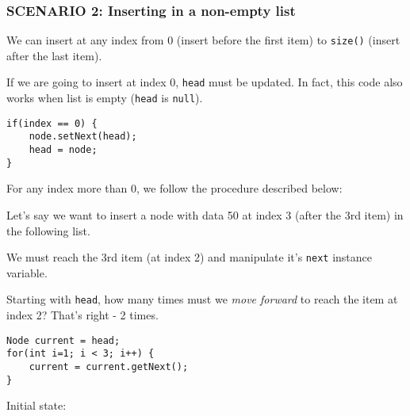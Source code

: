 \newpage

\subsubsection{SCENARIO 2: Inserting in a non-empty list}

We can insert at any index from 0 (insert before the first item) to \texttt{size()} (insert after the last item).

If we are going to insert at index 0, \texttt{head} must be updated. In fact, this code also works when list is empty (\texttt{head} is \texttt{null}).

\begin{lstlisting}
if(index == 0) {
	node.setNext(head);
	head = node;
}
\end{lstlisting}

For any index more than 0, we follow the procedure described below:

Let's say we want to insert a node with data 50 at index 3 (after the 3rd item) in the following list.

\vskip 0.5cm

\bgroup \tikzset{png export}  \egroup

We must reach the 3rd item (at index 2) and manipulate it's \texttt{next} instance variable.

Starting with \texttt{head}, how many times must we \emph{move forward} to reach the item at index 2? That's right - 2 times.

\begin{lstlisting}
Node current = head;
for(int i=1; i < 3; i++) {
	current = current.getNext();
}
\end{lstlisting}

Initial state:
\vskip 0.5cm

